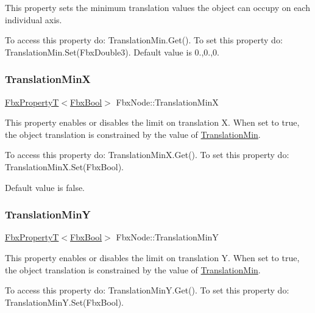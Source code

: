 This property sets the minimum translation values the object can occupy on each individual axis.

To access this property do\+: Translation\+Min.\+Get(). To set this property do\+: Translation\+Min.\+Set(\+Fbx\+Double3). Default value is 0.,0.,0. \mbox{\label{class_fbx_node_a8ffb0049319dbb88db7c0536b4c97339}} 
\subsubsection{\texorpdfstring{Translation\+MinX}{TranslationMinX}}
{\footnotesize\ttfamily \hyperlink{class_fbx_property_t}{Fbx\+PropertyT}$<$\hyperlink{fbxtypes_8h_a92e0562b2fe33e76a242f498b362262e}{Fbx\+Bool}$>$ Fbx\+Node\+::\+Translation\+MinX}

This property enables or disables the limit on translation X. When set to {\ttfamily true}, the object translation is constrained by the value of \hyperlink{class_fbx_node_aaaa913d4332c2136f50ae15356521413}{Translation\+Min}.

To access this property do\+: Translation\+Min\+X.\+Get(). To set this property do\+: Translation\+Min\+X.\+Set(\+Fbx\+Bool).

Default value is false. \mbox{\label{class_fbx_node_a61c15c2ecc1e454320759c68e95e44b3}} 
\subsubsection{\texorpdfstring{Translation\+MinY}{TranslationMinY}}
{\footnotesize\ttfamily \hyperlink{class_fbx_property_t}{Fbx\+PropertyT}$<$\hyperlink{fbxtypes_8h_a92e0562b2fe33e76a242f498b362262e}{Fbx\+Bool}$>$ Fbx\+Node\+::\+Translation\+MinY}

This property enables or disables the limit on translation Y. When set to {\ttfamily true}, the object translation is constrained by the value of \hyperlink{class_fbx_node_aaaa913d4332c2136f50ae15356521413}{Translation\+Min}.

To access this property do\+: Translation\+Min\+Y.\+Get(). To set this property do\+: Translation\+Min\+Y.\+Set(\+Fbx\+Bool).

